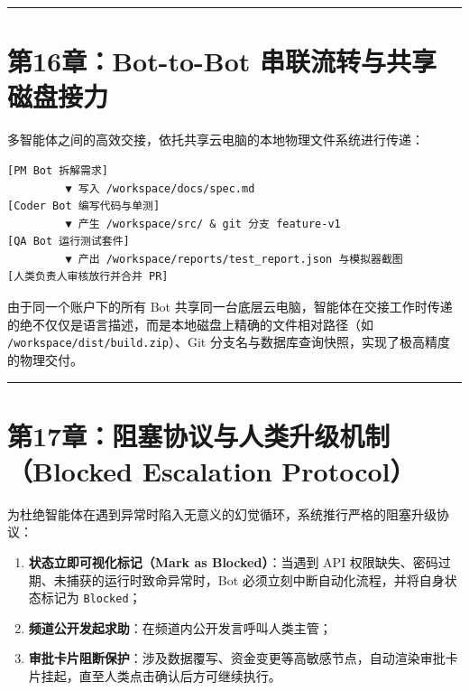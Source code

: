 \documentclass[10.5pt,a4paper,oneside]{report}
\providecommand{\tightlist}{\setlength{\itemsep}{0pt}\setlength{\parskip}{0pt}}
\newcommand{\passthrough}[1]{#1}
\begin{document}
\begin{center}\rule{0.5\linewidth}{0.5pt}\end{center}

\section{第16章：Bot-to-Bot
串联流转与共享磁盘接力}\label{ux7b2c16ux7ae0bot-to-bot-ux4e32ux8054ux6d41ux8f6cux4e0eux5171ux4eabux78c1ux76d8ux63a5ux529b}

多智能体之间的高效交接，依托共享云电脑的本地物理文件系统进行传递：

\begin{lstlisting}
[PM Bot 拆解需求]
         ▼ 写入 /workspace/docs/spec.md
[Coder Bot 编写代码与单测]
         ▼ 产生 /workspace/src/ & git 分支 feature-v1
[QA Bot 运行测试套件]
         ▼ 产出 /workspace/reports/test_report.json 与模拟器截图
[人类负责人审核放行并合并 PR]
\end{lstlisting}

由于同一个账户下的所有 Bot
共享同一台底层云电脑，智能体在交接工作时传递的绝不仅仅是语言描述，而是本地磁盘上精确的文件相对路径（如
\passthrough{\lstinline!/workspace/dist/build.zip!}）、Git
分支名与数据库查询快照，实现了极高精度的物理交付。

\begin{center}\rule{0.5\linewidth}{0.5pt}\end{center}

\section{第17章：阻塞协议与人类升级机制（Blocked Escalation
Protocol）}\label{ux7b2c17ux7ae0ux963bux585eux534fux8baeux4e0eux4ebaux7c7bux5347ux7ea7ux673aux5236blocked-escalation-protocol}

为杜绝智能体在遇到异常时陷入无意义的幻觉循环，系统推行严格的阻塞升级协议：

\begin{enumerate}
\def\labelenumi{\arabic{enumi}.}
\tightlist
\item
  \textbf{状态立即可视化标记（Mark as Blocked）}：当遇到 API
  权限缺失、密码过期、未捕获的运行时致命异常时，Bot
  必须立刻中断自动化流程，并将自身状态标记为
  \passthrough{\lstinline!Blocked!}；
\item
  \textbf{频道公开发起求助}：在频道内公开发言呼叫人类主管；
\item
  \textbf{审批卡片阻断保护}：涉及数据覆写、资金变更等高敏感节点，自动渲染审批卡片挂起，直至人类点击确认后方可继续执行。
\end{enumerate}
\end{document}
